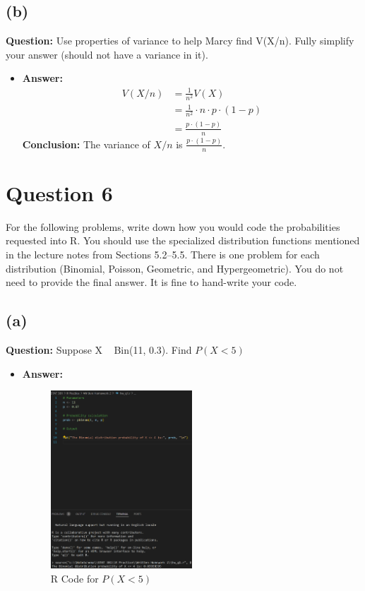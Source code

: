 \documentclass{article}
\begin{document}
\subsection*{(b)} \textbf{Question:} Use properties of variance to help Marcy find V(X/n). Fully simplify your answer
(should not have a variance in it).
\begin{itemize}
    \item[] \textbf{Answer:} 
    \begin{equation*}
        \begin{aligned}
        V(X/n) &= \frac{1}{n^2}V(X) \\
        &= \frac{1}{n^2} \cdot n \cdot p \cdot (1 - p) \\
        &= \frac{p \cdot (1 - p)}{n}
        \end{aligned}
    \end{equation*}
    \textbf{Conclusion:} The variance of $X/n$ is $\frac{p \cdot (1 - p)}{n}$.
\end{itemize}
\newpage
\section*{Question 6} For the following problems, write down how you would code the probabilities requested into
R. You should use the specialized distribution functions mentioned in the lecture notes
from Sections 5.2–5.5. There is one problem for each distribution (Binomial, Poisson,
Geometric, and Hypergeometric). You do not need to provide the final answer. It is fine
to hand-write your code.
\subsection*{(a)} \textbf{Question:} Suppose X ~ Bin(11, 0.3). Find $P(X < 5)$
\begin{itemize}
    \item[] \textbf{Answer:} 
    \begin{figure}[h]
        \centering
        \includegraphics[width=0.5\textwidth]{RHW2.6.a.png}
        \caption{R Code for $P(X < 5)$}
        \label{fig:RHW2.6.a}
    \end{figure}
\end{itemize}
\end{document}
